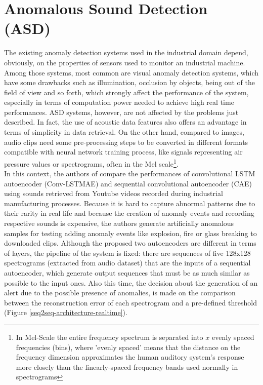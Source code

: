 \section{Anomalous Sound Detection (ASD)}
The existing anomaly detection systems used in the industrial domain depend, obviously, on the properties of sensors used to monitor an industrial machine. Among those systems, most common are visual anomaly detection systems, which have some drawbacks such as illumination, occlusion by objects, being out of the field of view and so forth, which strongly affect the performance of the system, especially in terms of computation power needed to achieve high real time performances. ASD systems, however, are not affected by the problems just described. In fact, the use of acoustic data features also offers an advantage in terms of simplicity in data retrieval. On the other hand, compared to images, audio clips need some pre-processing steps to be converted in different formats compatible with neural network training process, like signals representing air pressure values or spectrograms, often in the Mel scale\footnote{In Mel-Scale the entire frequency spectrum is separated into $x$ evenly spaced frequencies (bins), where 'evenly spaced' means that the distance on the frequency dimension approximates the human auditory system’s response more closely than the linearly-spaced frequency bands used normally in spectrograms}.\\
In this context, the authors of \cite{13RealTimeDetectionUsingSequentialAutoencoder} compare the performances of convolutional LSTM autoencoder (Conv-LSTMAE)  and sequential convolutional autoencoder (CAE) using sounds retrieved from Youtube videos recorded during industrial manufacturing processes. Because it is hard to capture abnormal patterns due to their rarity in real life and because the creation of anomaly events and recording respective sounds is expensive, the authors generate artificially anomalous samples for testing adding anomaly events like explosion, fire or glass breaking to downloaded clips. Although the proposed two autoencoders are different in terms of layers, the pipeline of the system is fixed: there are sequences of five 128x128 spectrograms (extracted from audio dataset) that are the inputs of a sequential autoencoder, which generate output sequences that must be as much similar as possible to the input ones. Also this time, the decision about the generation of an alert due to the possible presence of anomalies, is made on the comparison between the reconstruction error of each spectrogram and a pre-defined threshold (Figure \ref{seq2seq-architecture-realtime}).

